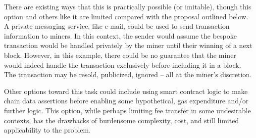 \documentclass[11pt]{article}
\theoremstyle{plain}
\begin{document}
There are existing ways that this is practically possible (or imitable),
though this option and others like it are limited compared with the proposal outlined below.
A private messaging service, like e-mail, could be used to send
transaction information to miners.
In this context, the sender would assume the bespoke transaction would be handled privately by the miner
until their winning of a next block.
However, in this example, there could be no guarantee that the miner would indeed handle
the transaction exclusively before including it in a block.
The transaction may be resold, publicized, ignored -- all at the miner's discretion.

Other options toward this task could include using smart contract logic to make
chain data assertions before enabling some hypothetical, gas expenditure and/or further logic.
This option, while perhaps limiting fee transfer in some undesirable contexts,
has the drawbacks of burdensome complexity, cost, and still limited applicability to the problem.
\end{document}

